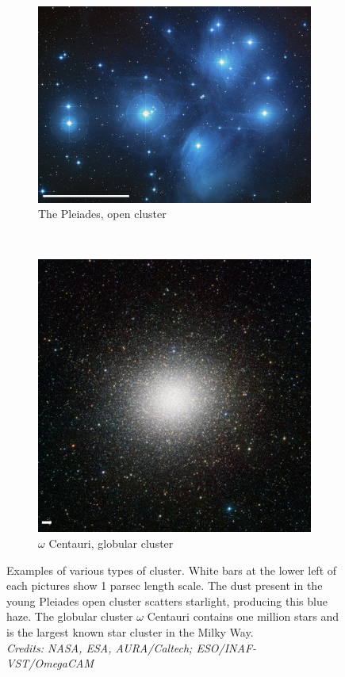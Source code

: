 \begin{figure}
    \centering
    \begin{subfigure}[b]{0.55\textwidth}
        \includegraphics[width=\textwidth]{Figures/0_Pleiades_scale.jpg}
        \caption{The Pleiades, open cluster}
        \label{Fig:0_openglobular1.open}
    \end{subfigure}
    ~ 
    \begin{subfigure}[b]{0.4\textwidth}
        \includegraphics[width=\textwidth]{Figures/0_omega_centauri_scale.jpg}
        \caption{$\omega$ Centauri, globular cluster}
        \label{Fig:0_openglobular1.glob}
    \end{subfigure}
     \caption{Examples of various types of cluster. White bars at the lower left of each pictures show 1 parsec length scale. The dust present in the young Pleiades open cluster scatters starlight, producing this blue haze. The globular cluster $\omega$ Centauri contains one million stars and is the largest known star cluster in the Milky Way.\\\textit{Credits: NASA, ESA, AURA/Caltech; ESO/INAF-VST/OmegaCAM}}
     \label{Fig:0_openglobular}
\end{figure}
